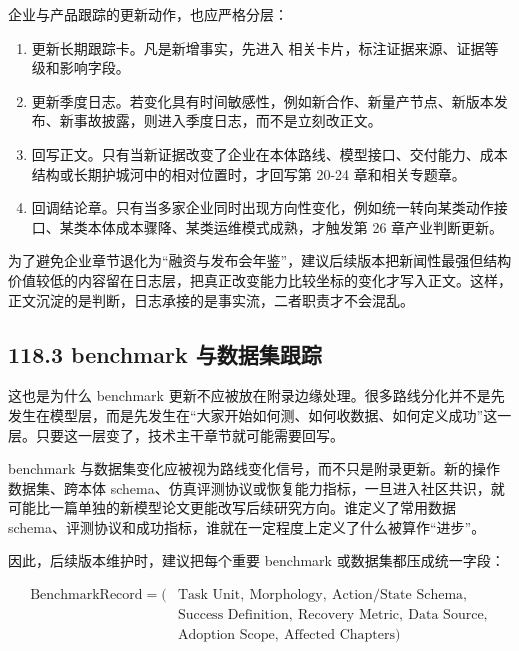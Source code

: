 企业与产品跟踪的更新动作，也应严格分层：

\begin{enumerate}
\item 更新长期跟踪卡。凡是新增事实，先进入  相关卡片，标注证据来源、证据等级和影响字段。
\item 更新季度日志。若变化具有时间敏感性，例如新合作、新量产节点、新版本发布、新事故披露，则进入季度日志，而不是立刻改正文。
\item 回写正文。只有当新证据改变了企业在本体路线、模型接口、交付能力、成本结构或长期护城河中的相对位置时，才回写第 20-24 章和相关专题章。
\item 回调结论章。只有当多家企业同时出现方向性变化，例如统一转向某类动作接口、某类本体成本骤降、某类运维模式成熟，才触发第 26 章产业判断更新。
\end{enumerate}

为了避免企业章节退化为“融资与发布会年鉴”，建议后续版本把新闻性最强但结构价值较低的内容留在日志层，把真正改变能力比较坐标的变化才写入正文。这样，正文沉淀的是判断，日志承接的是事实流，二者职责才不会混乱。

\subsection*{118.3 benchmark 与数据集跟踪}


这也是为什么 benchmark 更新不应被放在附录边缘处理。很多路线分化并不是先发生在模型层，而是先发生在“大家开始如何测、如何收数据、如何定义成功”这一层。只要这一层变了，技术主干章节就可能需要回写。

benchmark 与数据集变化应被视为路线变化信号，而不只是附录更新。新的操作数据集、跨本体 schema、仿真评测协议或恢复能力指标，一旦进入社区共识，就可能比一篇单独的新模型论文更能改写后续研究方向。谁定义了常用数据 schema、评测协议和成功指标，谁就在一定程度上定义了什么被算作“进步”。

因此，后续版本维护时，建议把每个重要 benchmark 或数据集都压成统一字段：

\begingroup
\scriptsize
\begin{equation*}
\begin{aligned}
\text{BenchmarkRecord} = (&\text{Task Unit},\ \text{Morphology},\ \text{Action/State Schema},\\
&\text{Success Definition},\ \text{Recovery Metric},\ \text{Data Source},\\
&\text{Adoption Scope},\ \text{Affected Chapters})
\end{aligned}
\end{equation*}
\endgroup

